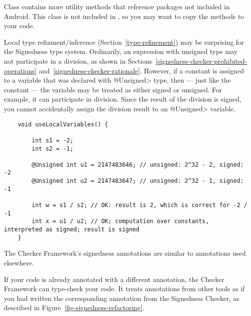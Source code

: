 Class  contains more utility
methods that reference packages not included in Android.  This class is not
included in , so you may want to copy the methods to your code.



Local type refinment/inference (Section~\ref{type-refinement}) may be
surprising for the Signedness type system.  Ordinarily, an expression with
unsigned type may not participate in a division, as shown in
Sections~\ref{signedness-checker-prohibited-operations}
and~\ref{signedness-checker-rationale}.  However, if a constant is assigned
to a variable that was declared with \<@Unsigned> type, then --- just like
the constant --- the variable may be treated as either signed or unsigned.
For example, it can participate in division.  Since the result of the
division is signed, you cannot accidentally assign the division result to
an \<@Unsigned> variable.

\begin{Verbatim}
    void useLocalVariables() {

        int s1 = -2;
        int s2 = -1;

        @Unsigned int u1 = 2147483646; // unsigned: 2^32 - 2, signed: -2
        @Unsigned int u2 = 2147483647; // unsigned: 2^32 - 1, signed: -1

        int w = s1 / s2; // OK: result is 2, which is correct for -2 / -1
        int x = u1 / u2; // OK; computation over constants, interpreted as signed; result is signed
    }
\end{Verbatim}



The Checker Framework's signedness annotations are similar to annotations used
elsewhere.

If your code is already annotated with a different
annotation, the Checker Framework can type-check your code.
It treats annotations from other tools
as if you had written the corresponding annotation from the
Signedness Checker, as described in Figure~\ref{fig-signedness-refactoring}.


